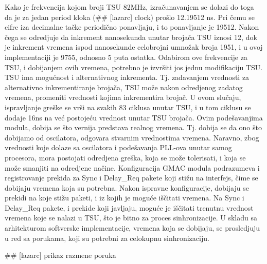 \documentclass[a4paper,12pt, master]{etf}
\begin{document}
	Kako je frekvencija kojom broji TSU 82MHz, izra\v{c}unavanjem se dolazi do 
	toga da je za jedan period kloka (\#\# [lazarc] clock) pro\v{s}lo 12.19512 
	ns. Pri \v{c}emu se cifre iza decimalne ta\v{c}ke periodi\v{c}no ponavljaju,
	 i to ponavljanje je 19512. Nakon \v{c}ega se odredjuje da inkrement 
	nanosekunda unutar broja\v{c}a TSU iznosi 12, dok je inkrement vremena 
	ispod nanosekunde celobrojni umno\v{z}ak broja 1951, i u ovoj 
	implementaciji je 9755, odnosno 5 puta ostatka. Odabirom ove frekvencije za 
	TSU, i dobijanjem ovih vremena, potrebno je izvr\v{s}iti jos jednu 
	modifikaciju TSU\@. TSU ima mogu\'{c}nost i alternativnog inkrementa. Tj\@. 
	zadavanjem vrednosti za alternativno inkrementiranje broja\v{c}a, TSU 
	mo\v{z}e nakon odredjenog zadatog vremena, promeniti vrednosti kojima 
	inkrementira broja\v{c}. U ovom slu\v{c}aju, ispravljanje gre\v{s}ke se 
	vr\v{s}i na svakih 83 ciklusa unutar TSU, i u tom ciklusu se dodaje 16ns na 
	ve\'{c} postoje\'{c}u vrednost unutar TSU broja\v{c}a. Ovim 
	pode\v{s}avanjima modula, dobija se \v{s}to vernija predstava realnog 
	vremena. Tj\@. dobija se da ono \v{s}to dobijamo od oscilatora, odgovara 
	stvarnim vrednostima vremena. Naravno, zbog vrednosti koje dolaze sa 
	oscilatora i pode\v{s}avanja PLL-ova unutar samog procesora, mora postojati 
	odredjena gre\v{s}ka, koja se mo\v{z}e tolerisati, i koja se mo\v{z}e 
	smanjiti na odredjene na\v{c}ine. Konfiguracija GMAC modula podrazumeva i 
	registrovanje prekida za Sync i Delay\_Req pakete koji sti\v{z}u na 
	interfejs, \v{c}ime se dobijaju vremena koja su potrebna. Nakon ispravne 
	konfiguracije, dobijaju se prekidi na koje sti\v{z}u paketi, i iz kojih je 
	mogu\'{c}e i\v{s}\v{c}itati vremena. Na Sync i Delay\_Req pakete, i prekide 
	koji javljaju, mogu\'{c}e je i\v{s}\v{c}itati trenutnu vrednost vremena 
	koje se nalazi u TSU, \v{s}to je bitno za proces sinhronizacije. U skladu 
	sa arhitekturom softverske implementacije, vremena koja se dobijaju, se 
	prosledjuju u red sa porukama, koji su potrebni za celokupnu sinhronizaciju.

	\#\# [lazarc] prikaz razmene poruka
\end{document}
